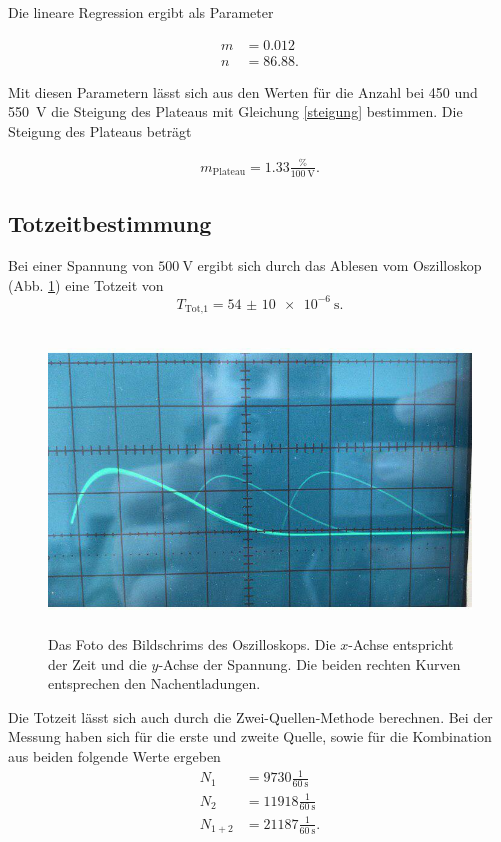 \noindent Die lineare Regression ergibt als Parameter

\begin{align*} 
   m &= 0.012 \\
   n &= 86.88.
\end{align*}

\noindent Mit diesen Parametern lässt sich aus den Werten für die Anzahl bei \num{450} und \SI{550}{\volt} die Steigung des Plateaus mit Gleichung \eqref{steigung} bestimmen.
Die Steigung des Plateaus beträgt 

\begin{align*} 
    m_\text{Plateau} = 1.33 \frac{\si{\percent}}{\SI{100}{\volt}}.
\end{align*}

\subsection{Totzeitbestimmung}

Bei einer Spannung von $\SI{500}{\volt}$ ergibt sich durch das Ablesen vom Oszilloskop (Abb. \ref{foto}) eine Totzeit von 
\begin{equation*}
    T_\text{Tot,1} = \SI{54(10)e-6}{\second}.
\end{equation*}

\begin{figure}
    \centering
    \includegraphics[width=12cm, height=8cm]{build/foto.jpg}
    \caption{Das Foto des Bildschrims des Oszilloskops. Die $x$-Achse entspricht der Zeit und die $y$-Achse der Spannung. Die beiden rechten Kurven entsprechen den Nachentladungen.}
    \label{foto}
\end{figure}

\noindent Die Totzeit lässt sich auch durch die Zwei-Quellen-Methode berechnen. 
Bei der Messung haben sich für die erste und zweite Quelle, sowie für die Kombination aus beiden folgende Werte ergeben
\begin{align*} 
   N_1 &= 9730 \frac{1}{\SI{60}{\second}}\\
   N_2 &= 11918 \frac{1}{\SI{60}{\second}} \\
   N_{1+2} &= 21187 \frac{1}{\SI{60}{\second}}.
\end{align*}


